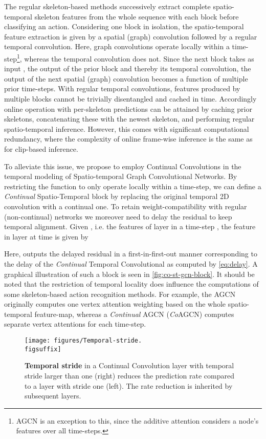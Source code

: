 \documentclass[journal]{IEEEtran}
\newcommand{\figsuffix}{png}
\theoremstyle{definition}
\begin{document}
The regular skeleton-based methods successively extract complete spatio-temporal skeleton features from the whole sequence with each block before classifying an action.
Considering one block in isolation, the spatio-temporal feature extraction is given by a spatial (graph) convolution followed by a regular temporal convolution. Here, graph convolutions operate locally within a time-step\footnote{AGCN is an exception to this, since the additive attention considers a node's features over all time-steps.},
whereas the temporal convolution does not.
Since the next block  takes as input , the output of the prior block and thereby its temporal convolution, the output of the next spatial (graph) convolution becomes a function of multiple prior time-steps. 
With regular temporal convolutions, features produced by multiple blocks cannot be trivially disentangled and cached in time. Accordingly online operation with per-skeleton predictions can be attained by caching  prior skeletons, concatenating these with the newest skeleton, and performing regular spatio-temporal inference. However, this comes with significant computational redundancy, where the complexity of online frame-wise inference is the same as for clip-based inference.

To alleviate this issue, we propose to employ Continual Convolutions in the temporal modeling of Spatio-temporal Graph Convolutional Networks.
By restricting the  function to only operate locally within a time-step, we can define a \textit{Continual} Spatio-Temporal block by replacing the original temporal 2D convolution with a continual one. To retain weight-compatibility with regular (non-continual) networks we moreover need to delay the residual to keep temporal alignment.
Given , i.e. the features of layer  in a time-step , the feature in layer  at time  is given by

Here,  outputs the delayed residual in a first-in-first-out manner corresponding to the delay of the \textit{Continual} Temporal Convolutional as computed by \cref{eq:delay}.
A graphical illustration of such a block is seen in \cref{fig:co-st-gcn-block}.
It should be noted that the restriction of temporal locality does influence the computations of some skeleton-based action recognition methods. For example, the AGCN originally computes one vertex attention weighting based on the whole spatio-temporal feature-map, whereas a \textit{Continual} AGCN (\textit{Co}AGCN) computes separate vertex attentions for each time-step.

\begin{figure}[tb]
    \centering
    \texttt{[image: figures/Temporal-stride.\\figsuffix]}
    \caption{\textbf{Temporal stride} in a Continual Convolution layer  with temporal stride larger than one (right) reduces the prediction rate compared to a layer with stride one (left). The rate reduction is inherited by subsequent layers.}
    \label{fig:stride}
\end{figure}
\end{document}
